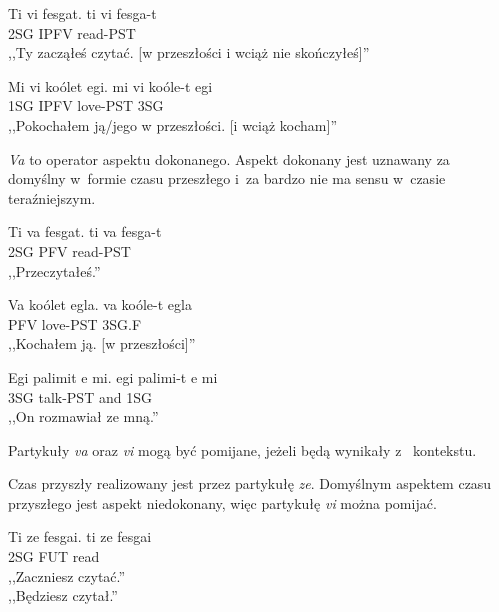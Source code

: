 \begin{spacing}{1.1}
\begin{exe}
	\ex
	\trans Ti vi fesgat.
	\gll  ti vi fesga-t\\
	  2SG IPFV read-PST \\
	\glt  ,,Ty zacząłeś czytać. [w przeszłości i wciąż nie skończyłeś]''
\end{exe}

\begin{exe}
	\ex
	\trans Mi vi koólet egi.
	\gll  mi vi koóle-t egi\\
	  1SG IPFV love-PST 3SG \\
	\glt  ,,Pokochałem ją/jego w przeszłości. [i wciąż kocham]''
\end{exe}

\emph{Va} to operator aspektu dokonanego. Aspekt dokonany jest uznawany za
domyślny w~formie czasu przeszłego i~za bardzo nie ma sensu w~czasie
teraźniejszym.

\begin{exe}
	\ex
	\trans Ti va fesgat.
	\gll  ti va fesga-t\\
	  2SG PFV read-PST \\
	\glt  ,,Przeczytałeś.''
\end{exe}

\begin{exe}
	\ex
	\trans Va koólet egla.
	\gll  va koóle-t egla\\
	  PFV love-PST 3SG.F \\
	\glt  ,,Kochałem ją. [w przeszłości]''
\end{exe}

\begin{exe}
	\ex
	\trans Egi palimit e mi.
	\gll  egi palimi-t e mi\\
	  3SG talk-PST and 1SG \\
	\glt  ,,On rozmawiał ze mną.''
\end{exe}

Partykuły \emph{va} oraz \emph{vi} mogą być pomijane, jeżeli będą wynikały z~
kontekstu.

Czas przyszły realizowany jest przez partykułę \emph{ze}. Domyślnym aspektem
czasu przyszłego jest aspekt niedokonany, więc partykułę \emph{vi} można
pomijać.

\begin{exe}
	\ex
	\trans Ti ze fesgai.
	\gll  ti ze fesgai\\
	  2SG FUT read \\
	\glt  ,,Zaczniesz czytać.'' \\ ,,Będziesz czytał.''
\end{exe}


\end{spacing}

